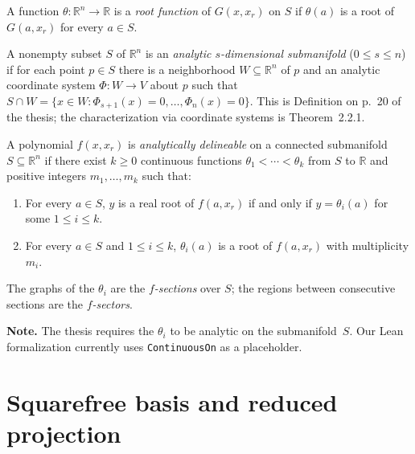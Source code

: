 \begin{definition}
  \label{def:IsRootFunction}
  \leanok
  A function $\theta \colon \mathbb{R}^n \to \mathbb{R}$ is a \emph{root function}
  of $G(x, x_r)$ on $S$ if $\theta(a)$ is a root of $G(a, x_r)$ for every $a \in S$.
\end{definition}

\begin{definition}
  \label{def:IsAnalyticSubmanifold}
  \leanok
  A nonempty subset $S$ of $\mathbb{R}^n$ is an \emph{analytic $s$-dimensional
  submanifold} ($0 \le s \le n$) if for each point $p \in S$ there is a neighborhood
  $W \subseteq \mathbb{R}^n$ of $p$ and an analytic coordinate system
  $\Phi \colon W \to V$ about $p$ such that
  $S \cap W = \{ x \in W : \Phi_{s+1}(x) = 0, \ldots, \Phi_n(x) = 0 \}$.
  This is Definition on p.~20 of the thesis; the characterization via coordinate
  systems is Theorem~2.2.1.
\end{definition}

\begin{definition}
  \label{def:AnalyticDelineable}
  \leanok
  A polynomial $f(x, x_r)$ is \emph{analytically delineable} on a connected
  submanifold $S \subseteq \mathbb{R}^n$ if there exist $k \ge 0$ continuous
  functions $\theta_1 < \cdots < \theta_k$ from $S$ to $\mathbb{R}$ and positive
  integers $m_1, \ldots, m_k$ such that:
  \begin{enumerate}
    \item For every $a \in S$, $y$ is a real root of $f(a, x_r)$ if and only if
          $y = \theta_i(a)$ for some $1 \le i \le k$.
    \item For every $a \in S$ and $1 \le i \le k$, $\theta_i(a)$ is a root of
          $f(a, x_r)$ with multiplicity $m_i$.
  \end{enumerate}
  The graphs of the $\theta_i$ are the \emph{$f$-sections} over $S$; the regions
  between consecutive sections are the \emph{$f$-sectors}.

  \textbf{Note.}  The thesis requires the $\theta_i$ to be analytic on the
  submanifold~$S$.  Our Lean formalization currently uses \texttt{ContinuousOn}
  as a placeholder.
\end{definition}

\section{Squarefree basis and reduced projection}


